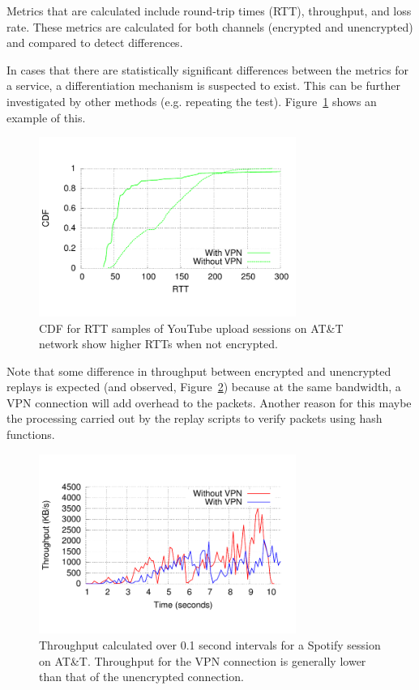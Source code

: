\documentclass[letterpaper]{sig-alternate-10pt}
\begin{document}
Metrics that are calculated include round-trip times (RTT), throughput, and loss rate. These metrics are calculated for both channels (encrypted and unencrypted) and compared to detect differences.

In cases that there are statistically significant differences between the metrics for a service, a differentiation mechanism is suspected to exist. This can be further investigated by other methods (e.g. repeating the test). Figure~\ref{fig:att_dbu} shows an example of this.

\begin{figure}[ht]
\centering
\includegraphics[width=3.3in]{figures/att_dbu_cdfrttp}
\caption{CDF for RTT samples of YouTube upload sessions on AT\&T network show higher RTTs when not encrypted.}
\label{fig:att_dbu}
\end{figure}

Note that some difference in throughput between encrypted and unencrypted replays is expected (and observed, Figure~\ref{fig:xputs}) because at the same bandwidth, a VPN connection will add overhead to the packets. Another reason for this maybe the processing carried out by the replay scripts to verify packets using hash functions.

\begin{figure}[ht]
\centering
\includegraphics[width=3.3in]{figures/xp}
\caption{Throughput calculated over 0.1 second intervals for a Spotify session on AT\&T. Throughput for the VPN connection is generally lower than that of the unencrypted connection.}
\label{fig:xputs}
\end{figure}
\end{document}
